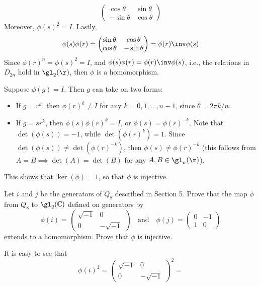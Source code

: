 \begin{problems}
\begin{solalph}
\[\begin{pmatrix}
            \cos\theta & \sin\theta \\
            -\sin\theta & \cos\theta
        \end{pmatrix}
        \]
        Moreover, $\phi(s)^2 = I$. Lastly,
        \[\phi(s)\phi(r) = 
        \begin{pmatrix}
            \sin\theta & \cos\theta \\
            \cos\theta & -\sin\theta
        \end{pmatrix} = 
        \phi(r)\inv\phi(s)\]
        Since $\phi(r)^n = \phi(s)^2 = I$, and $\phi(s)\phi(r) = \phi(r)\inv\phi(s)$, i.e., the relations in $D_{2n}$ hold in $\gl_2(\r)$, then $\phi$ is a homomorphism.
        \item Suppose $\phi(g) = I$. Then $g$ can take on two forms:
        \begin{itemize}
            \item If $g = r^k$, then $\phi(r)^k \neq I$ for any $k = 0, 1, \ldots, n - 1$, since $\theta = 2\pi k/n$.
            \item If $g = sr^k$, then $\phi(s)\phi(r)^k = I$, or $\phi(s) = \phi(r)^{-k}$. Note that $\det(\phi(s)) = -1$, while $\det(\phi(r)^k) = 1$. Since $\det(\phi(s)) \neq \det(\phi(r)^{-k})$, then $\phi(s) \neq \phi(r)^{-k}$ (this follows from $A = B \implies \det(A) = \det(B)$ for any $A, B \in \gl_n(\r)$).
        \end{itemize}
        This shows that $\ker(\phi) = 1$, so that $\phi$ is injective.
    \end{solalph}
    \item Let $i$ and $j$ be the generators of $Q_8$ described in Section 5. Prove that the map $\phi$ from $Q_8$ to $\gl_2(\mathbb{C})$ defined on generators by
    \[\phi(i) = 
    \begin{pmatrix}
        \sqrt{-1} & 0 \\
        0 & -\sqrt{-1}
    \end{pmatrix}
    \quad \text{and} \quad
    \phi(j) = 
    \begin{pmatrix}
        0 & -1 \\
        1 & 0
    \end{pmatrix}
    \]
    extends to a homomorphism. Prove that $\phi$ is injective.
    \begin{sol}
        It is easy to see that
        \[\phi(i)^2 = 
        \begin{pmatrix}
            \sqrt{-1} & 0 \\
            0 & -\sqrt{-1}
        \end{pmatrix}^2 = 
\]
\end{sol}
\end{problems}
